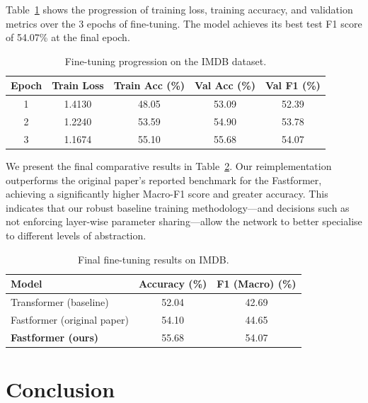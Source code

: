 \documentclass[11pt,a4paper]{article}
\theoremstyle{definition}
\begin{document}
Table~\ref{tab:finetune_progression} shows the progression of training loss, training accuracy, and validation metrics over the 3 epochs of fine-tuning. The model achieves its best test F1 score of 54.07\% at the final epoch.

\begin{table}[H]
\centering
\caption{Fine-tuning progression on the IMDB dataset.}
\label{tab:finetune_progression}
\begin{tabular}{ccccc}
\toprule
\textbf{Epoch} & \textbf{Train Loss} & \textbf{Train Acc (\%)} & \textbf{Val Acc (\%)} & \textbf{Val F1 (\%)} \\
\midrule
1 & 1.4130 & 48.05 & 53.09 & 52.39 \\
2 & 1.2240 & 53.59 & 54.90 & 53.78 \\
3 & 1.1674 & 55.10 & 55.68 & 54.07 \\
\bottomrule
\end{tabular}
\end{table}

We present the final comparative results in Table~\ref{tab:results}. Our reimplementation outperforms the original paper's reported benchmark for the Fastformer, achieving a significantly higher Macro-F1 score and greater accuracy. This indicates that our robust baseline training methodology---and decisions such as not enforcing layer-wise parameter sharing---allow the network to better specialise to different levels of abstraction.

\begin{table}[H]
\centering
\caption{Final fine-tuning results on IMDB.}
\label{tab:results}
\begin{tabular}{lcc}
\toprule
\textbf{Model} & \textbf{Accuracy (\%)} & \textbf{F1 (Macro) (\%)} \\
\midrule
Transformer (baseline)      &  52.04    &  42.69 \\
Fastformer (original paper) & 54.10 & 44.65 \\
\textbf{Fastformer (ours)}  & 55.68 & 54.07 \\
\bottomrule
\end{tabular}
\end{table}

\section{Conclusion}
\label{sec:conclusion}
\end{document}

